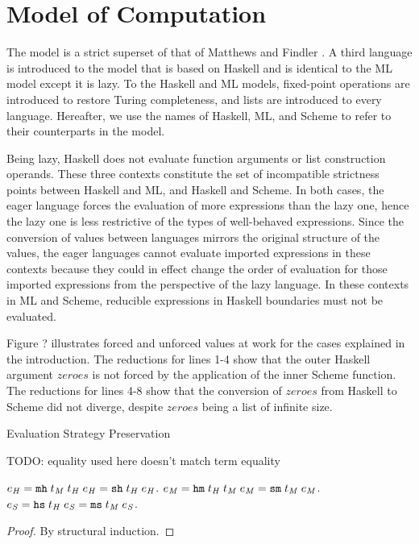 \section{Model of Computation}

The model is a strict superset of that of Matthews and Findler \cite{matthews07}. A third language is introduced to the model that is based on Haskell and is identical to the ML model except it is lazy. To the Haskell and ML models, fixed-point operations are introduced to restore Turing completeness, and lists are introduced to every language. Hereafter, we use the names of Haskell, ML, and Scheme to refer to their counterparts in the model.

Being lazy, Haskell does not evaluate function arguments or list construction operands. These three contexts constitute the set of incompatible strictness points between Haskell and ML, and Haskell and Scheme. In both cases, the eager language forces the evaluation of more expressions than the lazy one, hence the lazy one is less restrictive of the types of well-behaved expressions. Since the conversion of values between languages mirrors the original structure of the values, the eager languages cannot evaluate imported expressions in these contexts because they could in effect change the order of evaluation for those imported expressions from the perspective of the lazy language. In these contexts in ML and Scheme, reducible expressions in Haskell boundaries must not be evaluated.





Figure ? illustrates forced and unforced values at work for the cases explained in the introduction. The reductions for lines 1-4 show that the outer Haskell argument $zeroes$ is not forced by the application of the inner Scheme function. The reductions for lines 4-8 show that the conversion of $zeroes$ from Haskell to Scheme did not diverge, despite $zeroes$ being a list of infinite size.

\begin{theorem}{Evaluation Strategy Preservation}

TODO: equality used here doesn't match term equality

\label{thmstr}
$e_{\mathit{H}} = \mathtt{mh} \; t_{\mathit{M}} \; t_{\mathit{H}} \; e_{\mathit{H}} = \mathtt{sh} \; t_{\mathit{H}} \; e_{\mathit{H}}$.
$e_{\mathit{M}} = \mathtt{hm} \; t_{\mathit{H}} \; t_{\mathit{M}} \; e_{\mathit{M}} = \mathtt{sm} \; t_{\mathit{M}} \; e_{\mathit{M}}$.
$e_{\mathit{S}} = \mathtt{hs} \; t_{\mathit{H}} \; e_{\mathit{S}} = \mathtt{ms} \; t_{\mathit{M}} \; e_{\mathit{S}}$.
\begin{proof}
By structural induction.
\end{proof}
\end{theorem}

